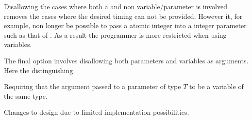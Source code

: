 Disallowing  the cases where both a  and non  variable/parameter is involved removes the cases where the desired timing can not be provided. However it, for example, non longer be possible to pass a atomic integer into a  integer parameter such as that of . As a result the programmer is more restricted when using  variables.

The final option involves disallowing both  parameters and  variables as  arguments. Here the distinguishing 

 
Requiring that the argument passed to a parameter of type  $T$ to be a variable of the same type. 
 
Changes to design due to limited implementation possibilities.
\worksheetend